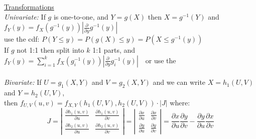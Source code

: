\documentclass[11pt]{article}
\begin{document}
\indent\underline{Transformations}\\
{\it Univariate:} If $g$ is one-to-one, and $Y = g(X)$ then $ X = g^{-1}(Y)$ and $f_Y(y) =
f_X\left(g^{-1}(y)\right) \left|\frac{\partial}{\partial y}g^{-1}(y)\right|$\\
\hspace*{1.5em}{\it or} use the cdf: $P(Y \leq y) = P(g(X)
\leq y) = P(X \leq g^{-1}(y))$\\
\hspace*{1.5em}If $g$ not 1:1 then split into $k$ 1:1 parts, and $f_Y(y) = \sum_{i=1}^k
f_X\left(g_i^{-1}(y)\right)\left|\frac{\partial}{\partial y}g_i^{-1}(y)\right|$\ \  or use
the\\
\\
{\it Bivariate:} If $U=g_1(X,Y)$ and $V=g_2(X,Y)$ and we can write $X = h_1(U,V)$ and
$Y=h_2(U,V)$,\\
\hspace*{1.5em}then $f_{U,V}(u,v) = f_{X,Y}\left(h_1(U,V), h_2(U,V)\right)\cdot |J|$ where:
\renewcommand{\arraystretch}{1.7}
\[
J = \left| \begin{array}{cc}%
			\frac{\partial h_1(u,v)}{\partial u}       &      \frac{\partial h_1(u,v)}{\partial v}   \\
              
      \frac{\partial h_2(u,v)}{\partial u}       &      \frac{\partial h_2(u,v)}{\partial v}    %
      \end{array} \right| =
%
      \left|\begin{array}{cc}%
			\frac{\partial x}{\partial u}       &      \frac{\partial x}{\partial v}   \\
               
      \frac{\partial y}{\partial u}       &      \frac{\partial y}{\partial v}    %
      \end{array} \right| =
%
\frac{\partial x}{\partial u} \frac{\partial y}{\partial v} -
\frac{\partial y}{\partial u} \frac{\partial x}{\partial v}
\]
\end{document}
